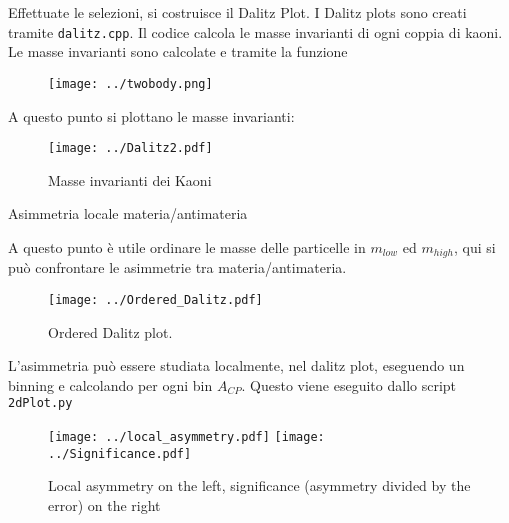 \documentclass[8pt,a4paper]{beamer}
\begin{document}
\begin{frame}

Effettuate le selezioni, si costruisce il Dalitz Plot. I Dalitz plots sono creati tramite \texttt{dalitz.cpp}. Il codice calcola le masse invarianti di ogni coppia di kaoni. Le masse invarianti sono calcolate e tramite la funzione 

\begin{figure}[hbtp]
\centering
\texttt{[image: ../twobody.png]}
\end{figure}
A questo punto si plottano le masse invarianti: 

\begin{figure}[hbtp]
\centering
\texttt{[image: ../Dalitz2.pdf]}
\caption{Masse invarianti dei Kaoni}
\end{figure}
\end{frame}

\begin{frame}{Asimmetria locale materia/antimateria}

A questo punto è utile ordinare le masse delle particelle in $m_{low}$ ed $m_{high}$, qui si può confrontare le asimmetrie tra materia/antimateria. 
\begin{figure}[hbtp]
\centering
\texttt{[image: ../Ordered\_Dalitz.pdf]}
\caption{Ordered Dalitz plot.}
\end{figure}

\end{frame}

\begin{frame}
L'asimmetria può essere studiata localmente, nel dalitz plot, eseguendo un binning e calcolando per ogni bin $A_{CP}$. Questo viene eseguito dallo script \texttt{2dPlot.py }

\begin{figure}[hbtp]
\centering
\texttt{[image: ../local\_asymmetry.pdf]}
\texttt{[image: ../Significance.pdf]} 
\caption{Local asymmetry on the left, significance (asymmetry divided by the error) on the right}\label{fig:Significance}
\end{figure}

\end{frame}
\end{document}
